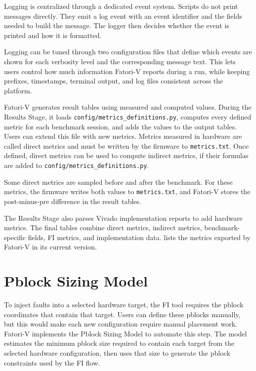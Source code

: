 Logging is centralized through a dedicated event system. Scripts do not print messages directly. They emit a log event with an event identifier and the fields needed to build the message. The logger then decides whether the event is printed and how it is formatted.

Logging can be tuned through two configuration files that define which events are shown for each verbosity level and the corresponding message text. This lets users control how much information \ac{Fatori-V} reports during a run, while keeping prefixes, timestamps, terminal output, and log files consistent across the platform.


\ac{Fatori-V} generates result tables using measured and computed values. During the Results Stage, it loads \texttt{config/metrics\_definitions.py}, computes every defined metric for each benchmark session, and adds the values to the output tables. Users can extend this file with new metrics. Metrics measured in hardware are called direct metrics and must be written by the firmware to \texttt{metrics.txt}. Once defined, direct metrics can be used to compute indirect metrics, if their formulas are added to \texttt{config/metrics\_definitions.py}.

Some direct metrics are sampled before and after the benchmark. For these metrics, the firmware writes both values to \texttt{metrics.txt}, and \ac{Fatori-V} stores the post-minus-pre difference in the result tables.

The Results Stage also parses Vivado implementation reports to add hardware metrics. The final tables combine direct metrics, indirect metrics, benchmark-specific fields, \ac{FI} metrics, and implementation data.  lists the metrics exported by \ac{Fatori-V} in its current version.



\section{Pblock Sizing Model}
\label{chap7:pblock}


To inject faults into a selected hardware target, the \ac{FI} tool requires the pblock coordinates that contain that target. Users can define these pblocks manually, but this would make each new configuration require manual placement work. \ac{Fatori-V} implements the Pblock Sizing Model to automate this step. The model estimates the minimum pblock size required to contain each target from the selected hardware configuration, then uses that size to generate the pblock constraints used by the \ac{FI} flow.

